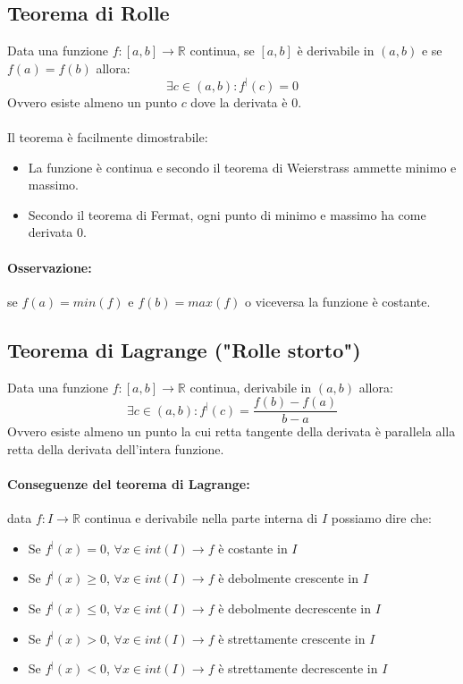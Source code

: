\documentclass[12pt,a4paper]{article}
\begin{document}
\subsection{Teorema di Rolle}
Data una funzione $f:[a,b] \rightarrow \mathbb{R}$ continua, se $[a,b]$ è derivabile in $(a,b)$ e se $f(a) = f(b)$ allora:
\[
\exists c \in (a,b) : f^|(c) = 0
\]
Ovvero esiste almeno un punto $c$ dove la derivata è 0.\\\\
Il teorema è facilmente dimostrabile:
\begin{itemize}
  \item La funzione è continua e secondo il teorema di Weierstrass ammette minimo e massimo.
  \item Secondo il teorema di Fermat, ogni punto di minimo e massimo ha come derivata 0.
\end{itemize}
\paragraph{Osservazione: } se $f(a) = min(f)$ e $f(b) = max(f)$ o viceversa la funzione è costante.

\subsection{Teorema di Lagrange ("Rolle storto")}
Data una funzione $f:[a,b] \rightarrow \mathbb{R}$ continua, derivabile in $(a,b)$ allora:
\[
\exists c \in (a,b) : f^|(c) = \frac{f(b) - f(a)}{b - a}
\]
Ovvero esiste almeno un punto la cui retta tangente della derivata è parallela alla retta della derivata dell'intera funzione.
\paragraph{Conseguenze del teorema di Lagrange:} data $f:I \rightarrow \mathbb{R}$ continua e derivabile nella parte interna di $I$ possiamo dire che:
\begin{itemize}
  \item Se $f^|(x) = 0$, $\forall x \in int(I) \rightarrow f$ è costante in $I$
  \item Se $f^|(x) \geq 0$, $\forall x \in int(I) \rightarrow f$ è debolmente crescente in $I$
  \item Se $f^|(x) \leq 0$, $\forall x \in int(I) \rightarrow f$ è debolmente decrescente in $I$
  \item Se $f^|(x) > 0$, $\forall x \in int(I) \rightarrow f$ è strettamente crescente in $I$
  \item Se $f^|(x) < 0$, $\forall x \in int(I) \rightarrow f$ è strettamente decrescente in $I$
\end{itemize}
\end{document}
